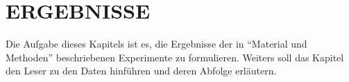 \documentclass[./\jobname.tex]{subfiles}
\begin{document}
%
\section{ERGEBNISSE}\raggedbottom
%
Die Aufgabe dieses Kapitels ist es, die Ergebnisse der in \enquote{Material und Methoden} beschriebenen Experimente zu formulieren. Weiters soll das Kapitel den Leser zu den Daten hinführen und deren Abfolge erläutern.
%
\end{document}
